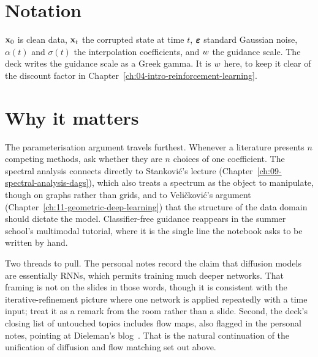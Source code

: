 \section*{Notation}

$\mathbf{x}_0$ is clean data, $\mathbf{x}_t$ the corrupted state at time $t$, $\boldsymbol{\varepsilon}$ standard Gaussian noise,
$\alpha(t)$ and $\sigma(t)$ the interpolation coefficients, and $w$ the guidance scale.
The deck writes the guidance scale as a Greek gamma. It is $w$ here, to keep it clear of the
discount factor in Chapter~\ref{ch:04-intro-reinforcement-learning}.

\section*{Why it matters}

The parameterisation argument travels furthest. Whenever a literature presents $n$ competing
methods, ask whether they are $n$ choices of one coefficient.
The spectral analysis connects directly to Stanković's lecture
(Chapter~\ref{ch:09-spectral-analysis-dags}), which also treats a spectrum as the object to
manipulate, though on graphs rather than grids, and to Veličković's argument
(Chapter~\ref{ch:11-geometric-deep-learning}) that the structure of the data domain should
dictate the model. Classifier-free guidance reappears in the summer school's
multimodal tutorial, where it is the single line the notebook asks to be written by hand.

\begin{aside}
Two threads to pull. The personal notes record the claim that diffusion models are
essentially RNNs, which permits training much deeper networks. That framing is not on the
slides in those words, though it is consistent with the iterative-refinement picture where
one network is applied repeatedly with a time input; treat it as a remark from the room
rather than a slide. Second, the deck's closing list of untouched topics includes flow maps,
also flagged in the personal notes, pointing at Dieleman's blog~\citep{dieleman2026flowmaps}. That
is the natural continuation of the unification of diffusion and flow matching set out above.
\end{aside}
